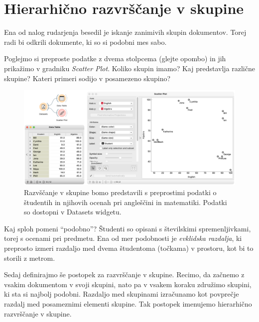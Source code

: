 \chapter{Hierarhično razvrščanje v skupine}
\label{ch:hierarhicno-razvrscanje}

Ena od nalog rudarjenja besedil je iskanje zanimivih skupin dokumentov. Torej radi bi odkrili dokumente, ki so si podobni mes sabo. 

Poglejmo si preproste podatke z dvema stolpcema (glejte opombo) in jih prikažimo v gradniku \textit{Scatter Plot}. Koliko skupin imamo? Kaj predstavlja različne skupine? Kateri primeri sodijo v posamezeno skupino?

\begin{figure}[h]
    \includegraphics[width=\linewidth]{grades.png}%
    \caption{Razvščanje v skupine bomo predstavili s preprostimi podatki o študentih in njihovih ocenah pri angleščini in matematiki. Podatki so dostopni v Datasets widgetu.}
    \label{fig:010-grades-example}
\end{figure}
  
Kaj sploh pomeni ``podobno''? Študenti so opisani s številskimi spremenljivkami, torej s ocenami pri predmetu. Ena od mer podobnosti je \textit{evklidska razdalja}, ki preprosto izmeri razdaljo med dvema študentoma (točkama) v prostoru, kot bi to storili z metrom.

Sedaj definirajmo še postopek za razvrščanje v skupine. Recimo, da začnemo z vsakim dokumentom v svoji skupini, nato pa v vsakem koraku združimo skupini, ki sta si najbolj podobni. Razdaljo med skupinami izračunamo kot povprečje razdalj med posameznimi elementi skupine. Tak postopek imenujemo hierarhično razvrščanje v skupine.

